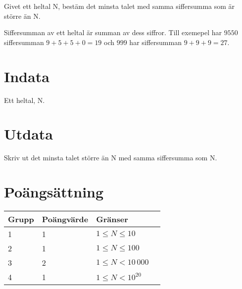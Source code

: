 
Givet ett heltal N, bestäm det minsta talet med samma siffersumma som är större än N.

Siffersumman av ett heltal är summan av dess siffror. Till exemepel har $9550$ siffersumman $9 + 5 + 5 + 0 = 19$ och $999$ har siffersumman $9 + 9 + 9 = 27$.

\section*{Indata}
Ett heltal, N.

\section*{Utdata}
Skriv ut det minsta talet större än N med samma siffersumma som N.

\section*{Poängsättning}

\begin{tabular}{| l | l | l | l |}
\hline
Grupp & Poängvärde & Gränser \\ \hline
1     & 1          & $1 \le N \le 10$ \\ \hline	
2     & 1          & $1 \le N \le 100$ \\ \hline	
3     & 2          & $1 \le N < 10\,000$ \\ \hline	
4     & 1          & $1 \le N < 10^{20}$ \\ \hline	
\end{tabular}
